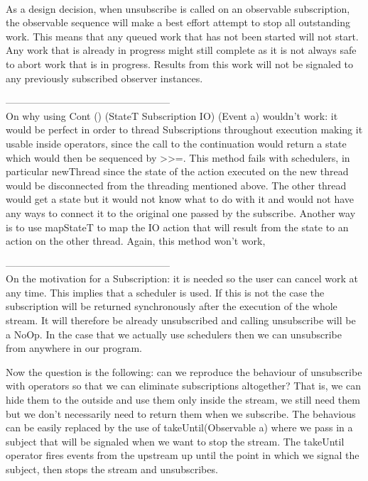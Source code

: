 \\

As a design decision, when unsubscribe is called on an observable subscription, the observable sequence will make a best effort attempt to stop all outstanding work. This means that any queued work that has not been started will not start. Any work that is already in progress might still complete as it is not always safe to abort work that is in progress. Results from this work will not be signaled to any previously subscribed observer instances.



--------------------------------------------------\\
On why using Cont () (StateT Subscription IO) (Event a) wouldn't work: it would be perfect in order to thread Subscriptions throughout execution making it usable inside operators, since the call to the continuation would return a state which would then be sequenced by >>=. This method fails with schedulers, in particular newThread since the state of the action executed on the new thread would be disconnected from the threading mentioned above. The other thread would get a state but it would not know what to do with it and would not have any ways to connect it to the original one passed by the subscribe. Another way is to use mapStateT to map the IO action that will result from the state to an action on the other thread. Again, this method won't work, 

--------------------------------------------------\\
On the motivation for a Subscription: it is needed so the user can cancel work at any time. This implies that a scheduler is used. If this is not the case the subscription will be returned synchronously after the execution of the whole stream. It will therefore be already unsubscribed and calling unsubscribe will be a NoOp. In the case that we actually use schedulers then we can unsubscribe from anywhere in our program. 

Now the question is the following: can we reproduce the behaviour of unsubscribe with operators so that we can eliminate subscriptions altogether? That is, we can hide them to the outside and use them only inside the stream, we still need them but we don't necessarily need to return them when we subscribe. The behavious can be easily replaced by the use of takeUntil(Observable a) where we pass in a subject that will be signaled when we want to stop the stream. The takeUntil operator fires events from the upstream up until the point in which we signal the subject, then stops the stream and unsubscribes. 

